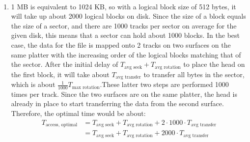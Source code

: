 \documentclass[12pt]{article}
\newenvironment{sol}[1][Solution]{\begin{trivlist}
		\item[\hskip \labelsep {\bfseries #1:}]}{\end{trivlist}}
\begin{document}
\begin{sol}
	\
	\begin{enumerate}[label=(\alph*)]
		\item 1 MB is equivalent to 1024 KB, so with a logical block size of 512 bytes, it will
		take up about 2000 logical blocks on disk. Since the size of a block equals the size of a
		sector, and there are 1000 tracks per sector on average for the given disk, this means
		that a sector can hold about 1000 blocks. In the best case, the data for the file is
		mapped onto 2 tracks on two surfaces on the same platter with the increasing order of the logical blocks matching that of the sector. After the initial delay of
		$T_{\text{avg seek}} + T_{\text{avg rotation}}$ to place the head on the first block, it
		will take about $T_{\text{avg transfer}}$ to transfer all bytes in the sector, which
		is about $\frac{1}{1000}T_{\text{max rotation}}$.These latter two steps are performed 1000 times
		per track. Since the two surfaces are on the same platter, the head is already in place to start
		transferring the data from the second surface. Therefore, the optimal time would be about:
		\begin{align*}
		T_{\text{access, optimal}}
		&=T_{\text{avg seek}} + T_{\text{avg rotation}}
		+2\cdot 1000\cdot T_{\text{avg transfer}}\\
		&=T_{\text{avg seek}} + T_{\text{avg rotation}} + 2000\cdot T_{\text{avg transfer}}
		\end{align*}
		

\end{enumerate}
\end{sol}
\end{document}
